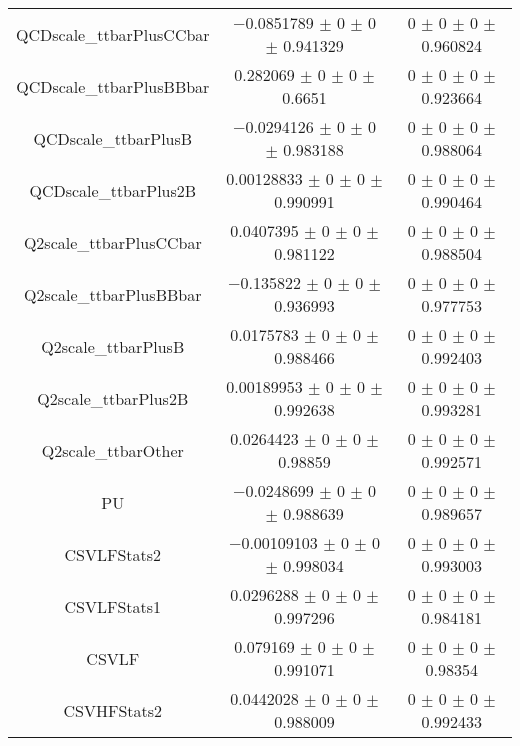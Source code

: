 \begin{table}
\begin{tabular}{ccc}
QCDscale\_ttbarPlusCCbar & \num{-0.0851789} $\pm$ \num{0} $\pm$ \num{0} $\pm$ \num{0.941329} & \num{0} $\pm$ \num{0} $\pm$ \num{0} $\pm$ \num{0.960824}\\
QCDscale\_ttbarPlusBBbar & \num{0.282069} $\pm$ \num{0} $\pm$ \num{0} $\pm$ \num{0.6651} & \num{0} $\pm$ \num{0} $\pm$ \num{0} $\pm$ \num{0.923664}\\
QCDscale\_ttbarPlusB & \num{-0.0294126} $\pm$ \num{0} $\pm$ \num{0} $\pm$ \num{0.983188} & \num{0} $\pm$ \num{0} $\pm$ \num{0} $\pm$ \num{0.988064}\\
QCDscale\_ttbarPlus2B & \num{0.00128833} $\pm$ \num{0} $\pm$ \num{0} $\pm$ \num{0.990991} & \num{0} $\pm$ \num{0} $\pm$ \num{0} $\pm$ \num{0.990464}\\
Q2scale\_ttbarPlusCCbar & \num{0.0407395} $\pm$ \num{0} $\pm$ \num{0} $\pm$ \num{0.981122} & \num{0} $\pm$ \num{0} $\pm$ \num{0} $\pm$ \num{0.988504}\\
Q2scale\_ttbarPlusBBbar & \num{-0.135822} $\pm$ \num{0} $\pm$ \num{0} $\pm$ \num{0.936993} & \num{0} $\pm$ \num{0} $\pm$ \num{0} $\pm$ \num{0.977753}\\
Q2scale\_ttbarPlusB & \num{0.0175783} $\pm$ \num{0} $\pm$ \num{0} $\pm$ \num{0.988466} & \num{0} $\pm$ \num{0} $\pm$ \num{0} $\pm$ \num{0.992403}\\
Q2scale\_ttbarPlus2B & \num{0.00189953} $\pm$ \num{0} $\pm$ \num{0} $\pm$ \num{0.992638} & \num{0} $\pm$ \num{0} $\pm$ \num{0} $\pm$ \num{0.993281}\\
Q2scale\_ttbarOther & \num{0.0264423} $\pm$ \num{0} $\pm$ \num{0} $\pm$ \num{0.98859} & \num{0} $\pm$ \num{0} $\pm$ \num{0} $\pm$ \num{0.992571}\\
PU & \num{-0.0248699} $\pm$ \num{0} $\pm$ \num{0} $\pm$ \num{0.988639} & \num{0} $\pm$ \num{0} $\pm$ \num{0} $\pm$ \num{0.989657}\\
CSVLFStats2 & \num{-0.00109103} $\pm$ \num{0} $\pm$ \num{0} $\pm$ \num{0.998034} & \num{0} $\pm$ \num{0} $\pm$ \num{0} $\pm$ \num{0.993003}\\
CSVLFStats1 & \num{0.0296288} $\pm$ \num{0} $\pm$ \num{0} $\pm$ \num{0.997296} & \num{0} $\pm$ \num{0} $\pm$ \num{0} $\pm$ \num{0.984181}\\
CSVLF & \num{0.079169} $\pm$ \num{0} $\pm$ \num{0} $\pm$ \num{0.991071} & \num{0} $\pm$ \num{0} $\pm$ \num{0} $\pm$ \num{0.98354}\\
CSVHFStats2 & \num{0.0442028} $\pm$ \num{0} $\pm$ \num{0} $\pm$ \num{0.988009} & \num{0} $\pm$ \num{0} $\pm$ \num{0} $\pm$ \num{0.992433}\\

\end{tabular}
\end{table}
